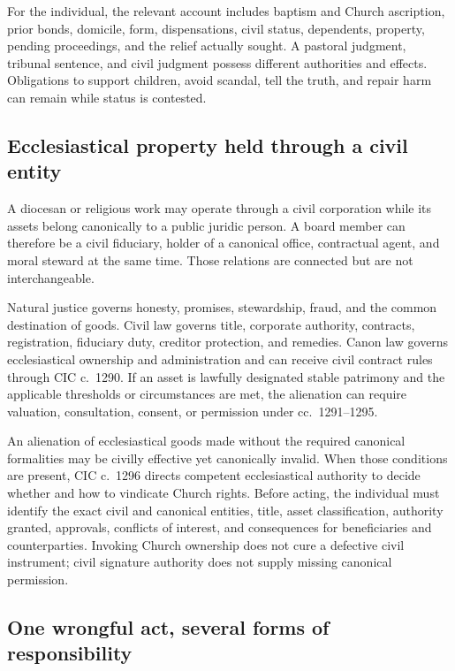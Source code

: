 For the individual, the relevant account includes baptism and Church ascription, prior bonds, domicile, form, dispensations, civil status, dependents, property, pending proceedings, and the relief actually sought. A pastoral judgment, tribunal sentence, and civil judgment possess different authorities and effects. Obligations to support children, avoid scandal, tell the truth, and repair harm can remain while status is contested.

\subsection{Ecclesiastical property held through a civil entity}

A diocesan or religious work may operate through a civil corporation while its assets belong canonically to a public juridic person. A board member can therefore be a civil fiduciary, holder of a canonical office, contractual agent, and moral steward at the same time. Those relations are connected but are not interchangeable.

Natural justice governs honesty, promises, stewardship, fraud, and the common destination of goods. Civil law governs title, corporate authority, contracts, registration, fiduciary duty, creditor protection, and remedies. Canon law governs ecclesiastical ownership and administration and can receive civil contract rules through CIC c.~1290. If an asset is lawfully designated stable patrimony and the applicable thresholds or circumstances are met, the alienation can require valuation, consultation, consent, or permission under cc.~1291--1295.

An alienation of ecclesiastical goods made without the required canonical formalities may be civilly effective yet canonically invalid. When those conditions are present, CIC c.~1296 directs competent ecclesiastical authority to decide whether and how to vindicate Church rights. Before acting, the individual must identify the exact civil and canonical entities, title, asset classification, authority granted, approvals, conflicts of interest, and consequences for beneficiaries and counterparties. Invoking Church ownership does not cure a defective civil instrument; civil signature authority does not supply missing canonical permission.

\subsection{One wrongful act, several forms of responsibility}

